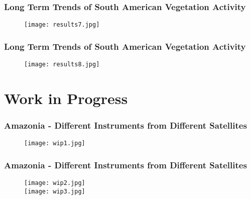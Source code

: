 \documentclass[11pt]{beamer}
\begin{document}
\begin{frame}[fragile]
  \frametitle{\normalsize{\textbf{
    Long Term Trends of South American Vegetation Activity
  }}} 

  \scriptsize{  

    \begin{figure}[h!]
      \centering
      \texttt{[image: results7.jpg]}
    \end{figure}

  }
\end{frame}

\begin{frame}[fragile]
  \frametitle{\normalsize{\textbf{
    Long Term Trends of South American Vegetation Activity
  }}} 

  \scriptsize{  

    \begin{figure}[h!]
      \centering
      \texttt{[image: results8.jpg]}
    \end{figure}

  }
\end{frame}

\section{Work in Progress}

\begin{frame}[fragile]
  \frametitle{\normalsize{\textbf{
    Amazonia - Different Instruments from Different Satellites
  }}} 

  \scriptsize{  

    \begin{figure}[h!]
      \centering
      \texttt{[image: wip1.jpg]}
    \end{figure}

  }
\end{frame}

\begin{frame}[fragile]
  \frametitle{\normalsize{\textbf{
    Amazonia - Different Instruments from Different Satellites
  }}} 

  \scriptsize{  

    \begin{figure}[h!]
      \centering
      \texttt{[image: wip2.jpg]} \\
      \texttt{[image: wip3.jpg]}
    \end{figure}

  }
\end{frame}
\end{document}
